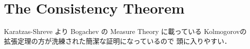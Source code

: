 \section{The Consistency Theorem}
	Karatzas-Shreve より Bogachev の Measure Theory に載っている
	Kolmogorovの拡張定理の方が洗練された簡潔な証明になっているので
	頭に入りやすい．
	
	